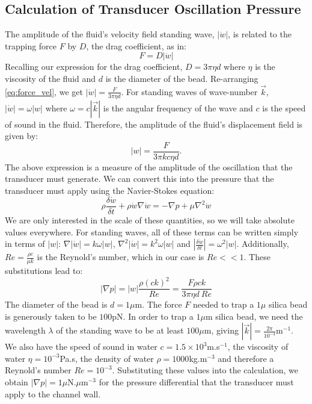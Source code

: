 \subsection{Calculation of Transducer Oscillation Pressure}

The amplitude of the fluid's velocity field standing wave, $|\dot{w}|$, is related to the trapping force $F$ by $D$, the drag coefficient, as in:
\begin{equation} \label{eq:force_vel}
F = D |\dot{w}|
\end{equation}
Recalling our expression for the drag coefficient, $D = 3 \pi \eta d$ where $\eta$ is the viscosity of the fluid and $d$ is the diameter of the bead. Re-arranging \ref{eq:force_vel}, we get $|\dot{w}| = \frac{F}{3 \pi \eta d}$. For standing waves of wave-number $\vec{k}$, $|\dot{w}| = \omega |w|$ where $\omega = c |\vec{k}|$ is the angular frequency of the wave and $c$ is the speed of sound in the fluid. Therefore, the amplitude of the fluid's displacement field is given by:
\begin{equation}
|w| = \frac{F}{3 \pi k c \eta d}.
\end{equation}
The above expression is a measure of the amplitude of the oscillation that the transducer must generate. We can convert this into the pressure that the transducer must apply using the Navier-Stokes equation:
\begin{equation}
\rho \frac{\delta \dot{w}}{\delta t} + \rho \dot{w} \nabla \dot{w} = - \nabla p + \mu \nabla^2 \dot{w}
\end{equation}
We are only interested in the scale of these quantities, so we will take absolute values everywhere. For standing waves, all of these terms can be written simply in terms of $|w|$: $\nabla |\dot{w}| = k \omega |w|$, $\nabla^2|\dot{w}| = k^2 \omega |w|$ and $\left|\frac{\delta \dot{w}}{\delta t}\right| = \omega^2 |w|$. Additionally, $Re = \frac{\rho c}{\mu k}$ is the Reynold's number, which in our case is $Re<<1$. These substitutions lead to:
\begin{equation}
|\nabla p| = |w| \frac{\rho(ck)^2}{Re} = \frac{F \rho c k}{3 \pi \eta d ~Re}
\end{equation}
The diameter of the bead is $d=1\mu$m. The force $F$ needed to trap a $1\mu$ silica bead is generously taken to be $100$pN\cite{optTrappingPaper}.  In order to trap a $1\mu$m silica bead, we need the wavelength $\lambda$ of the standing wave to be at least $100\mu$m, giving $|\vec{k}| = \frac{2 \pi}{10^{-4}}$m$^{-1}$. We also have the speed of sound in water $c = 1.5 \times 10^3 $m.s$^{-1}$, the viscosity of water $\eta = 10^{-3} $Pa.s, the density of water $\rho = 1000$kg.m$^{-3}$ and therefore a Reynold's number $Re=10^{-3}$. Substituting these values into the calculation, we obtain $|\nabla p| = 1\mu$N.$\mu$m$^{-3}$ for the pressure differential that the transducer must apply to the channel wall.

